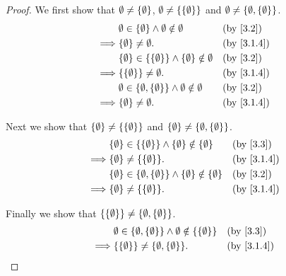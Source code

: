\begin{proof}
  We first show that \(\emptyset \neq \left\lbrace\emptyset\right\rbrace\), \(\emptyset \neq \left\lbrace\left\lbrace\emptyset\right\rbrace\right\rbrace\) and \(\emptyset \neq \left\lbrace\emptyset, \left\lbrace\emptyset\right\rbrace\right\rbrace\).
  \begin{align*}
             & \emptyset \in \set{\emptyset} \land \emptyset \notin \emptyset                   &  & \text{(by \cref{3.2})} \\
    \implies & \set{\emptyset} \neq \emptyset.                                                  &  & \by{3.1.4}             \\
             & \set{\emptyset} \in \set{\set{\emptyset}} \land \set{\emptyset} \notin \emptyset &  & \text{(by \cref{3.2})} \\
    \implies & \set{\set{\emptyset}} \neq \emptyset.                                            &  & \by{3.1.4}             \\
             & \emptyset \in \set{\emptyset, \set{\emptyset}} \land \emptyset \notin \emptyset  &  & \text{(by \cref{3.2})} \\
    \implies & \set{\emptyset} \neq \emptyset.                                                  &  & \by{3.1.4}
  \end{align*}

  Next we show that \(\left\lbrace\emptyset\right\rbrace \neq \left\lbrace\left\lbrace\emptyset\right\rbrace\right\rbrace\) and \(\left\lbrace\emptyset\right\rbrace \neq \left\lbrace\emptyset, \left\lbrace\emptyset\right\rbrace\right\rbrace\).
  \begin{align*}
             & \set{\emptyset} \in \set{\set{\emptyset}} \land \set{\emptyset} \notin \set{\emptyset}            &  & \text{(by \cref{3.3})} \\
    \implies & \set{\emptyset} \neq \set{\set{\emptyset}}.                                                       &  & \by{3.1.4}             \\
             & \set{\emptyset} \in \set{\emptyset, \set{\emptyset}} \land \set{\emptyset} \notin \set{\emptyset} &  & \text{(by \cref{3.2})} \\
    \implies & \set{\emptyset} \neq \set{\set{\emptyset}}.                                                       &  & \by{3.1.4}
  \end{align*}

  Finally we show that \(\left\lbrace\left\lbrace\emptyset\right\rbrace\right\rbrace \neq \left\lbrace\emptyset, \left\lbrace\emptyset\right\rbrace\right\rbrace\).
  \begin{align*}
             & \emptyset \in \set{\emptyset, \set{\emptyset}} \land \emptyset \notin \set{\set{\emptyset}} &  & \text{(by \cref{3.3})} \\
    \implies & \set{\set{\emptyset}} \neq \set{\emptyset, \set{\emptyset}}.                                &  & \by{3.1.4}
  \end{align*}
\end{proof}

